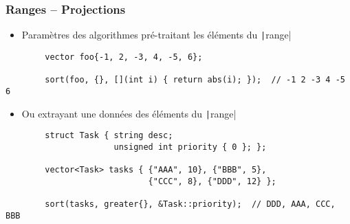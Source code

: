 \documentclass[C++.tex]{subfiles}
\begin{document}
\begin{frame}[fragile]
	\frametitle{Ranges -- Projections}
	\begin{itemize}
		\item Paramètres des algorithmes pré-traitant les éléments du \texttt|range|
	\end{itemize}

	\begin{verbatim}
		vector foo{-1, 2, -3, 4, -5, 6};

		sort(foo, {}, [](int i) { return abs(i); });  // -1 2 -3 4 -5 6
	\end{verbatim}


	\begin{itemize}
		\item Ou extrayant une données des éléments du \texttt|range|
	\end{itemize}

	\begin{verbatim}
		struct Task { string desc;
		              unsigned int priority { 0 }; };

		vector<Task> tasks { {"AAA", 10}, {"BBB", 5}, 
		                     {"CCC", 8}, {"DDD", 12} };

		sort(tasks, greater{}, &Task::priority);  // DDD, AAA, CCC, BBB
	\end{verbatim}
\end{frame}
\end{document}
